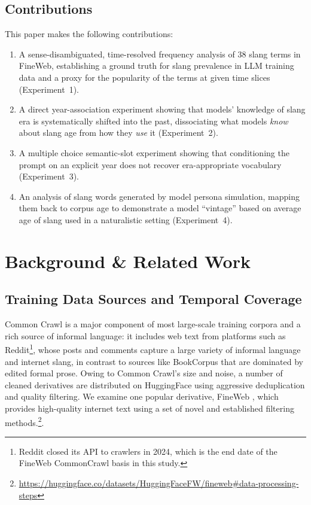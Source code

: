 \documentclass[11pt]{article}
\begin{document}
\subsection{Contributions}

This paper makes the following contributions:
\begin{enumerate}
  \item A sense-disambiguated, time-resolved frequency analysis of 38 slang terms in FineWeb, establishing a ground truth for slang prevalence in LLM training data and a proxy for the popularity of the terms at given time slices (Experiment~1).
  \item A direct year-association experiment showing that models' knowledge of slang era is systematically shifted into the past, dissociating what models \textit{know} about slang age from how they \textit{use} it (Experiment~2).
  \item A multiple choice semantic-slot experiment showing that conditioning the prompt on an explicit year does not recover era-appropriate vocabulary (Experiment~3).
  \item An analysis of slang words generated by model persona simulation, mapping them back to corpus age to demonstrate a model ``vintage'' based on average age of slang used in a naturalistic setting (Experiment~4).
\end{enumerate}

\section{Background \& Related Work}

\subsection{Training Data Sources and Temporal Coverage}

Common Crawl is a major component of most large-scale training corpora and a rich source of informal language: it includes web text from platforms such as Reddit\footnote{Reddit closed its API to crawlers in 2024, which is the end date of the FineWeb CommonCrawl basis in this study.}, whose posts and comments capture a large variety of informal language and internet slang, in contrast to sources like BookCorpus that are dominated by edited formal prose. Owing to Common Crawl's size and noise, a number of cleaned derivatives are distributed on HuggingFace using aggressive deduplication and quality filtering. We examine one popular derivative, FineWeb \citep{penedo2024the}, which provides high-quality internet text using a set of novel and established filtering methods.\footnote{\url{https://huggingface.co/datasets/HuggingFaceFW/fineweb\#data-processing-steps}}.
\end{document}

